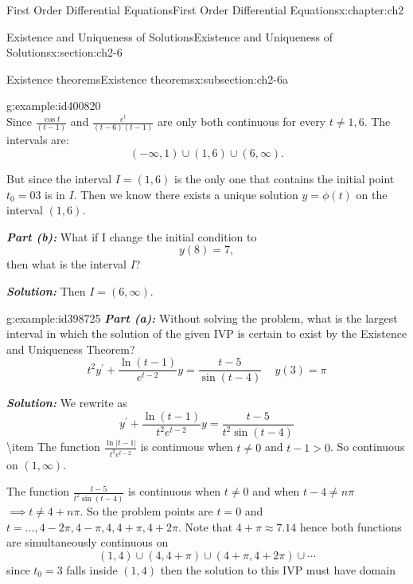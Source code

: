 \documentclass[oneside,10pt,]{book}
\newcommand{\alert}[1]{\textbf{\textit{#1}}}
\numberwithin{equation}{section}
\numberwithin{equation}{section}
\begin{document}
\begin{chapterptx}{First Order Differential Equations}{}{First Order Differential Equations}{}{}{x:chapter:ch2}
\begin{sectionptx}{Existence and Uniqueness of Solutions}{}{Existence and Uniqueness of Solutions}{}{}{x:section:ch2-6}
\begin{subsectionptx}{Existence theorems}{}{Existence theorems}{}{}{x:subsection:ch2-6a}
\begin{example}{}{g:example:id400820}
\begin{equation*}
\end{equation*}
Since \(\frac{\cos t}{(t-1)}\) and \(\frac{e^{t}}{\left(t-6\right)(t-1)}\) are only both continuous for every \(t\neq1,6\). The intervals are:%
\begin{equation*}
\left(-\infty,1\right)\cup\left(1,6\right)\cup\left(6,\infty\right).
\end{equation*}
%
\par
But since the interval \(I=(1,6)\) is the only one that contains the initial point \(t_{0}=03\) is in \(I\). Then we know there exists a unique solution \(y=\phi(t)\) on the interval \((1,6)\).%
\par
\alert{Part (b):} What if I change the initial condition to%
\begin{equation*}
y(8)=7,
\end{equation*}
then what is the interval \(I\)?%
\par
\alert{Solution:} Then \(I=\left(6,\infty\right)\).%
\end{example}
\begin{example}{}{g:example:id398725}%
\alert{Part (a):} Without solving the problem, what is the largest interval in which the solution of the given IVP is certain to exist by the Existence and Uniqueness Theorem?%
\begin{equation*}
t^{2}y^{\prime}+\frac{\ln\left(t-1\right)}{e^{t-2}}y=\frac{t-5}{\sin(t-4)}\,\,\,\,\,\,\,y(3)=\pi
\end{equation*}
%
\par
\alert{Solution:} We rewrite as%
\begin{equation*}
y^{\prime}+\frac{\ln\left(t-1\right)}{t^{2}e^{t-2}}y=\frac{t-5}{t^{2}\sin(t-4)}
\end{equation*}
\textbackslash{}item The function \(\frac{\ln\left|t-1\right|}{t^{2}e^{t-2}}\) is continuous when \(t\neq0\) and \(t-1>0\). So continuous on \((1,\infty)\).%
\par
The function \(\frac{t-5}{t^{2}\sin(t-4)}\) is continuous when \(t\neq0\) and when \(t-4\neq n\pi\) \(\implies t\neq4+n\pi\). So the problem points are \(t=0\) and \(t=\dots,4-2\pi,4-\pi,4,4+\pi,4+2\pi\). Note that \(4+\pi\approx7.14\) hence both functions are simultaneously continuous on%
\begin{equation*}
\left(1,4\right)\cup\left(4,4+\pi\right)\cup\left(4+\pi,4+2\pi\right)\cup\cdots
\end{equation*}
since \(t_{0}=3\) falls inside \((1,4)\) then the solution to this IVP must have domain%
\begin{equation*}

\end{equation*}
\end{example}
\end{subsectionptx}
\end{sectionptx}
\end{chapterptx}
\end{document}

